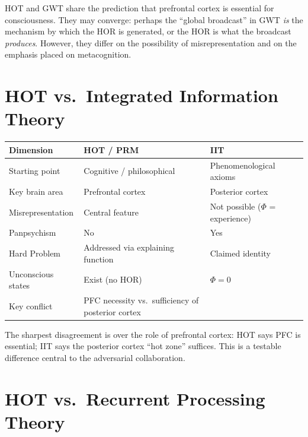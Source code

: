 \documentclass[11pt,a4paper]{report}
\begin{document}
HOT and GWT share the prediction that prefrontal cortex is essential for consciousness. They may converge: perhaps the ``global broadcast'' in GWT \emph{is} the mechanism by which the HOR is generated, or the HOR is what the broadcast \emph{produces}. However, they differ on the possibility of misrepresentation and on the emphasis placed on metacognition.

\section{HOT vs.\ Integrated Information Theory}

\begin{compbox}
\renewcommand{\arraystretch}{1.4}
\begin{tabular}{>{\raggedright}p{3cm} >{\raggedright}p{5cm} >{\raggedright\arraybackslash}p{5cm}}
  \toprule
  \textbf{Dimension} & \textbf{HOT / PRM} & \textbf{IIT} \\
  \midrule
  Starting point & Cognitive / philosophical & Phenomenological axioms \\
  Key brain area & Prefrontal cortex & Posterior cortex \\
  Misrepresentation & Central feature & Not possible ($\Phi$ = experience) \\
  Panpsychism & No & Yes \\
  Hard Problem & Addressed via explaining function & Claimed identity \\
  Unconscious states & Exist (no HOR) & $\Phi = 0$ \\
  Key conflict & PFC necessity vs.\ sufficiency of posterior cortex \\
  \bottomrule
\end{tabular}
\end{compbox}

The sharpest disagreement is over the role of prefrontal cortex: HOT says PFC is essential; IIT says the posterior cortex ``hot zone'' suffices. This is a testable difference central to the adversarial collaboration.

\section{HOT vs.\ Recurrent Processing Theory}
\end{document}
